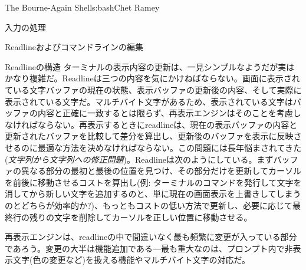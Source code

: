 \begin{aosachapter}{The Bourne-Again Shell}{s:bash}{Chet Ramey}
\begin{aosasect1}{入力の処理}
\begin{aosasect2}{Readlineおよびコマンドラインの編集}
\begin{aosasect3}{Readlineの構造}
ターミナルの表示内容の更新は、一見シンプルなようだが実はかなり複雑だ。Readlineは三つの内容を気にかけねばならない。画面に表示されている文字バッファの現在の状態、表示バッファの更新後の内容、そして実際に表示されている文字だ。マルチバイト文字があるため、表示されている文字はバッファの内容と正確に一致するとは限らず、再表示エンジンはそのことを考慮しなければならない。再表示するときにreadlineは、現在の表示バッファの内容と更新されたバッファを比較して差分を算出し、更新後のバッファを表示に反映させるのに最適な方法を決めなければならない。この問題には長年悩まされてきた(\emph{文字列から文字列への修正問題})。Readlineは次のようにしている。まずバッファの異なる部分の最初と最後の位置を見つけ、その部分だけを更新してカーソルを前後に移動させるコストを算出し(例: ターミナルのコマンドを発行して文字を消してから新しい文字を追加するのと、単に現在の画面表示を上書きしてしまうのとどちらが効率的か?)、もっともコストの低い方法で更新し、必要に応じて最終行の残りの文字を削除してカーソルを正しい位置に移動させる。

再表示エンジンは、readlineの中で間違いなく最も頻繁に変更が入っている部分であろう。変更の大半は機能追加である---最も重大なのは、プロンプト内で非表示文字(色の変更など)を扱える機能やマルチバイト文字の対応だ。


\end{aosasect3}
\end{aosasect2}
\end{aosasect1}
\end{aosachapter}
